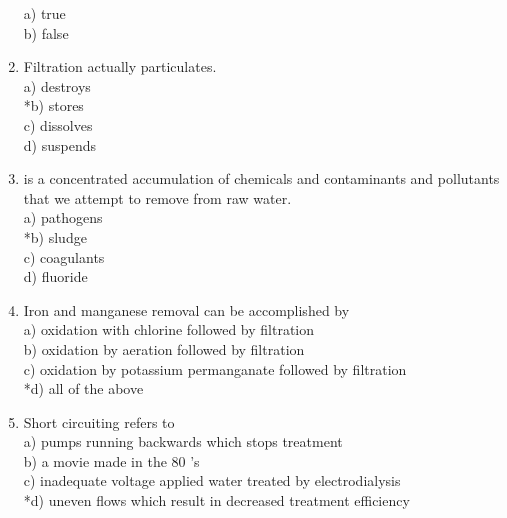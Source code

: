\begin{enumerate}
a) true\\
b) false\\
  \item Filtration actually particulates.\\
a) destroys\\
*b) stores\\
c) dissolves\\
d) suspends\\
 \item is a concentrated accumulation of chemicals and contaminants and pollutants that we attempt to remove from raw water.\\
a) pathogens\\
*b) sludge\\
c) coagulants\\
d) fluoride\\

  \item Iron and manganese removal can be accomplished by\\
a) oxidation with chlorine followed by filtration\\
b) oxidation by aeration followed by filtration\\
c) oxidation by potassium permanganate followed by filtration\\
*d) all of the above

  \item Short circuiting refers to\\
a) pumps running backwards which stops treatment\\
b) a movie made in the 80 's\\
c) inadequate voltage applied water treated by electrodialysis\\
*d) uneven flows which result in decreased treatment efficiency\\


\end{enumerate}
